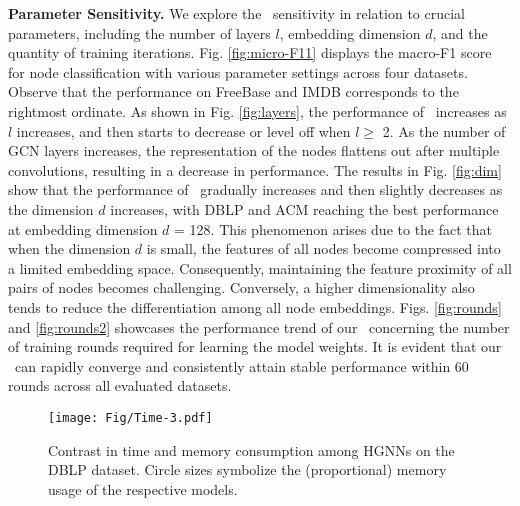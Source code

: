 {\bf Parameter Sensitivity.}
We explore the \alg~sensitivity in relation to crucial parameters, including the number of layers $l$, embedding dimension $d$, and the quantity of training iterations.
%
Fig. \ref{fig:micro-F11} displays the macro-F1 score for node classification with various parameter settings across four datasets. 
%
Observe that the performance on FreeBase and IMDB corresponds to the rightmost ordinate.
%
As shown in Fig. \ref{fig:layers}, the performance of \alg~increases as $l$ increases, and then starts to decrease or level off when $l \geq $ 2. 
As the number of GCN layers increases, the representation of the nodes flattens out after multiple convolutions, resulting in a decrease in performance.
%
The results in Fig. \ref{fig:dim} show that the performance of \alg~gradually increases and then slightly decreases as the dimension $d$ increases, with DBLP and ACM reaching the best performance at embedding dimension $d$ = 128. 
%
This phenomenon arises due to the fact that when the dimension $d$ is small, the features of all nodes become compressed into a limited embedding space. Consequently, maintaining the feature proximity of all pairs of nodes becomes challenging.
%
Conversely, a higher dimensionality also tends to reduce the differentiation among all node embeddings. 
%
Figs. \ref{fig:rounds} and \ref{fig:rounds2} showcases the performance trend of our \alg~concerning the number of training rounds required for learning the model weights. 
It is evident that our \alg~can rapidly converge and consistently attain stable performance within 60 rounds across all evaluated datasets. 

\begin{figure}[!t]
    \centering
    \texttt{[image: Fig/Time-3.pdf]}
    \caption{
    Contrast in time and memory consumption among HGNNs on the DBLP dataset. Circle sizes symbolize the (proportional) memory usage of the respective models.
    }
    \label{fig:time}
\end{figure}



